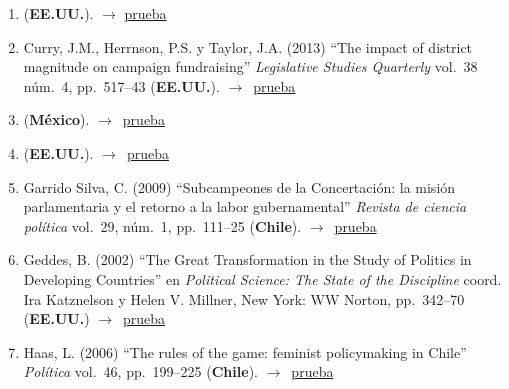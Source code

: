 \documentclass[12 pt, letter]{article}
\newenvironment{CitasMiTrabajo}{
    \begin{footnotesize}
    \begin{enumerate}[label={\footnotesize\emph{cita~\arabic*}},ref=\arabic*] %
        \setlength{\itemsep}{.1\itemsep}
        \setlength{\parskip}{.1\parskip}
    }{\end{enumerate}\end{footnotesize}}
\begin{document}
\begin{CitasMiTrabajo}
        \item {} (\textbf{EE.UU.}). $\rightarrow$ \href{https://www.jstor.org/stable/pdf/41289385.pdf?casa_token=fisv7eOzsM0AAAAA:G61AqOkHNF0CXNsFmtT74j6kSNVU49bcReM9WyGEEyl3FceeMtooQOmhIeNiRxucxQ5ZxDL_ixzHhkwnG4M4-_6YY5GcZIYGnQHuQ3ji5jSxlJ-O6DU}{prueba}
        
        \item Curry, J.M., Herrnson, P.S. y Taylor, J.A. (2013)
        ``The impact of district magnitude on campaign fundraising''
        \emph{Legislative Studies Quarterly} vol.\ 38 n\'um.\ 4, pp.\ 517--43 (\textbf{EE.UU.}). $\rightarrow$~\href{https://github.com/emagar/cv/blob/master/citasMiTrab/mrs/curryEtAl2013lsq.excerpts.pdf}{prueba}

        \item {} (\textbf{M\'exico}). $\rightarrow$~\href{https://www.ssoar.info/ssoar/bitstream/handle/document/45939/ssoar-rmee-2004-4-pena-Consideraciones_para_una_reforma_electoral.pdf?sequence=1}{prueba}
        
        \item {} (\textbf{EE.UU.}). $\rightarrow$~\href{https://www.cambridge.org/core/journals/latin-american-politics-and-society/article/polarization-and-electoral-incentives-the-end-of-the-chilean-consensus-democracy-19902014/5EFB566FB13612813A1F0123E34A2DD2}{prueba}
        
        \item Garrido Silva, C. (2009)
        ``Subcampeones de la Concertaci\'on: la misi\'on parlamentaria y el retorno a la labor gubernamental''
        \emph{Revista de ciencia pol\'itica}
        vol.\ 29, n\'um.\ 1, pp.\ 111--25 (\textbf{Chile}). $\rightarrow$~\href{https://github.com/emagar/cv/blob/master/citasMiTrab/mrs/garrido2009rcp.pdf}{prueba}

        \item Geddes, B. (2002)
        ``The Great Transformation in the
        Study of Politics in Developing Countries'' en \emph{Political Science: The
        State of the Discipline} coord. Ira Katznelson y Helen V. Millner,
        New York: WW Norton, pp.\ 342--70  (\textbf{EE.UU.}) $\rightarrow$~\href{https://github.com/emagar/cv/blob/master/citasMiTrab/mrs/geddesStateOfDisc.pdf}{prueba}

        \item Haas, L. (2006)
        ``The rules of the game: feminist policymaking in Chile''
        \emph{Pol\'itica}
        vol.\ 46,
        pp.\ 199--225   (\textbf{Chile}). $\rightarrow$~\href{https://github.com/emagar/cv/blob/master/citasMiTrab/mrs/haas2006politica.pdf}{prueba}


\end{CitasMiTrabajo}
\end{document}
